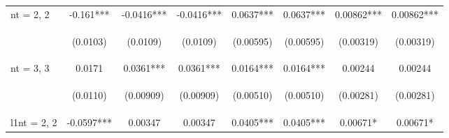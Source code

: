 \documentclass[]{article}
\begin{document}
\begin{center}
\begin{tabular}{lccccccc}
nt = 2, 2 & -0.161*** & -0.0416*** & -0.0416*** & 0.0637*** & 0.0637*** & 0.00862*** & 0.00862*** \\
\vspace{4pt} & \begin{footnotesize}(0.0103)\end{footnotesize} & \begin{footnotesize}(0.0109)\end{footnotesize} & \begin{footnotesize}(0.0109)\end{footnotesize} & \begin{footnotesize}(0.00595)\end{footnotesize} & \begin{footnotesize}(0.00595)\end{footnotesize} & \begin{footnotesize}(0.00319)\end{footnotesize} & \begin{footnotesize}(0.00319)\end{footnotesize} \\
nt = 3, 3 & 0.0171 & 0.0361*** & 0.0361*** & 0.0164*** & 0.0164*** & 0.00244 & 0.00244 \\
\vspace{4pt} & \begin{footnotesize}(0.0110)\end{footnotesize} & \begin{footnotesize}(0.00909)\end{footnotesize} & \begin{footnotesize}(0.00909)\end{footnotesize} & \begin{footnotesize}(0.00510)\end{footnotesize} & \begin{footnotesize}(0.00510)\end{footnotesize} & \begin{footnotesize}(0.00281)\end{footnotesize} & \begin{footnotesize}(0.00281)\end{footnotesize} \\
l1nt = 2, 2 & -0.0597*** & 0.00347 & 0.00347 & 0.0405*** & 0.0405*** & 0.00671* & 0.00671* \\

\end{tabular}
\end{center}
\end{document}
